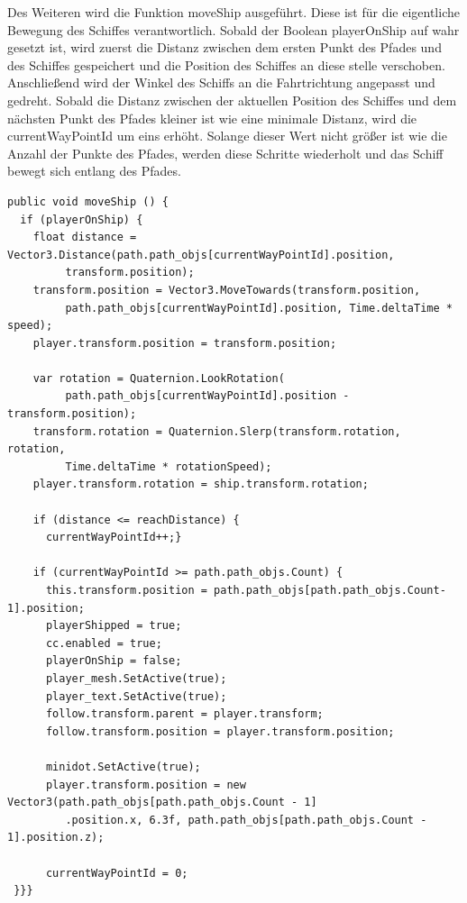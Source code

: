 			Des Weiteren wird die Funktion moveShip ausgeführt. Diese ist für die eigentliche Bewegung des Schiffes verantwortlich. Sobald der Boolean playerOnShip auf wahr gesetzt ist, wird zuerst die Distanz zwischen dem ersten Punkt des Pfades und des Schiffes gespeichert und die Position des Schiffes an diese stelle verschoben. Anschließend wird der Winkel des Schiffs an die Fahrtrichtung angepasst und gedreht. Sobald die Distanz zwischen der aktuellen Position des Schiffes und dem nächsten Punkt des Pfades kleiner ist wie eine minimale Distanz, wird die currentWayPointId um eins erhöht. Solange dieser Wert nicht größer ist wie die Anzahl der Punkte des Pfades, werden diese Schritte wiederholt und das Schiff bewegt sich entlang des Pfades.

\begin{scriptsize}
\lstset{
	float,
	caption=Methode: moveShip, 
	language=[Sharp]C, 
	frame=single,  
	showstringspaces=false, 
	showspaces=false, 
	numbers=left, 
	captionpos=b, 
	belowcaptionskip=4pt,
	basicstyle=\ttfamily
} 
\begin{lstlisting}[label=lst:methode2]
public void moveShip () {
  if (playerOnShip) {
    float distance = Vector3.Distance(path.path_objs[currentWayPointId].position, 
  	     transform.position);
    transform.position = Vector3.MoveTowards(transform.position, 
  	     path.path_objs[currentWayPointId].position, Time.deltaTime * speed);
    player.transform.position = transform.position;

    var rotation = Quaternion.LookRotation(
         path.path_objs[currentWayPointId].position - transform.position);
    transform.rotation = Quaternion.Slerp(transform.rotation, rotation, 
         Time.deltaTime * rotationSpeed);
    player.transform.rotation = ship.transform.rotation;

    if (distance <= reachDistance) {
      currentWayPointId++;}

    if (currentWayPointId >= path.path_objs.Count) {
      this.transform.position = path.path_objs[path.path_objs.Count-1].position;
      playerShipped = true;
      cc.enabled = true;
      playerOnShip = false;
      player_mesh.SetActive(true);
      player_text.SetActive(true);
      follow.transform.parent = player.transform;
      follow.transform.position = player.transform.position;

      minidot.SetActive(true);
      player.transform.position = new Vector3(path.path_objs[path.path_objs.Count - 1]
         .position.x, 6.3f, path.path_objs[path.path_objs.Count - 1].position.z);
                
      currentWayPointId = 0;
 }}}
    
\end{lstlisting}
\end{scriptsize}
